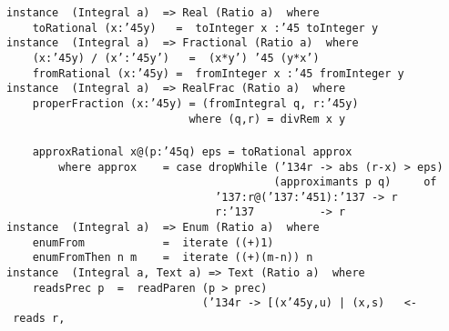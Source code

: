 {{{\mbox{\tt instance\ \ (Integral\ a)\ \ =>\ Real\ (Ratio\ a)\ \ where}\\
\mbox{\tt \ \ \ \ toRational\ (x:{\char'45}y)\ \ \ =\ \ toInteger\ x\ :{\char'45}\ toInteger\ y}
%
\eprogB\noindent\bprogB
\mbox{\tt instance\ \ (Integral\ a)\ \ =>\ Fractional\ (Ratio\ a)\ \ where}\\
\mbox{\tt \ \ \ \ (x:{\char'45}y)\ /\ (x':{\char'45}y')\ \ \ =\ \ (x*y')\ {\char'45}\ (y*x')}\\
\mbox{\tt \ \ \ \ fromRational\ (x:{\char'45}y)\ =\ \ fromInteger\ x\ :{\char'45}\ fromInteger\ y}
%
\eprogB\noindent\bprogB
\mbox{\tt instance\ \ (Integral\ a)\ \ =>\ RealFrac\ (Ratio\ a)\ \ where}\\
\mbox{\tt \ \ \ \ properFraction\ (x:{\char'45}y)\ =\ (fromIntegral\ q,\ r:{\char'45}y)}\\
\mbox{\tt \ \ \ \ \ \ \ \ \ \ \ \ \ \ \ \ \ \ \ \ \ \ \ \ \ \ \ \ where\ (q,r)\ =\ divRem\ x\ y}\\
\mbox{\tt }\\[-8pt]
\mbox{\tt \ \ \ \ approxRational\ x@(p:{\char'45}q)\ eps\ =\ toRational\ approx}\\
\mbox{\tt \ \ \ \ \ \ \ \ where\ approx\ \ \ \ =\ case\ dropWhile\ ({\char'134}r\ ->\ abs\ (r-x)\ >\ eps)}\\
\mbox{\tt \ \ \ \ \ \ \ \ \ \ \ \ \ \ \ \ \ \ \ \ \ \ \ \ \ \ \ \ \ \ \ \ \ \ \ \ \ \ \ \ \ (approximants\ p\ q)\ \ \ \ \ of}\\
\mbox{\tt \ \ \ \ \ \ \ \ \ \ \ \ \ \ \ \ \ \ \ \ \ \ \ \ \ \ \ \ \ \ \ \ {\char'137}:r@({\char'137}:{\char'45}1):{\char'137}\ ->\ r}\\
\mbox{\tt \ \ \ \ \ \ \ \ \ \ \ \ \ \ \ \ \ \ \ \ \ \ \ \ \ \ \ \ \ \ \ \ r:{\char'137}\ \ \ \ \ \ \ \ \ \ ->\ r}
%
\eprogB\noindent\bprogB
\mbox{\tt instance\ \ (Integral\ a)\ \ =>\ Enum\ (Ratio\ a)\ \ where}\\
\mbox{\tt \ \ \ \ enumFrom\ \ \ \ \ \ \ \ \ \ \ \ =\ \ iterate\ ((+)1)}\\
\mbox{\tt \ \ \ \ enumFromThen\ n\ m\ \ \ \ =\ \ iterate\ ((+)(m-n))\ n}
%
\eprogB\noindent\bprogB
\mbox{\tt instance\ \ (Integral\ a,\ Text\ a)\ =>\ Text\ (Ratio\ a)\ \ where}\\
\mbox{\tt \ \ \ \ readsPrec\ p\ \ =\ \ readParen\ (p\ >\ prec)}\\
\mbox{\tt \ \ \ \ \ \ \ \ \ \ \ \ \ \ \ \ \ \ \ \ \ \ \ \ \ \ \ \ \ \ ({\char'134}r\ ->\ [(x{\char'45}y,u)\ |\ (x,s)\ \ \ <-\ reads\ r,}\\
}}}
